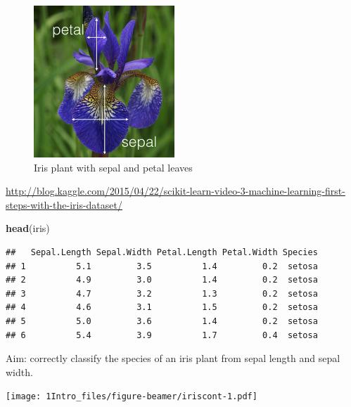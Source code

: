\documentclass[ignorenonframetext,]{beamer}
\newenvironment{Shaded}{\begin{snugshade}}{\end{snugshade}}
\newcommand{\KeywordTok}[1]{\textcolor[rgb]{0.13,0.29,0.53}{\textbf{#1}}}
\newcommand{\NormalTok}[1]{#1}
\begin{document}
\begin{frame}

\begin{figure}
\includegraphics[width=150pt]{iris} \caption{Iris plant with sepal and petal leaves}\label{fig:iris_pic}
\end{figure}

\url{http://blog.kaggle.com/2015/04/22/scikit-learn-video-3-machine-learning-first-steps-with-the-iris-dataset/}

\end{frame}

\begin{frame}[fragile]

\scriptsize

\begin{Shaded}
\begin{Highlighting}[]
\KeywordTok{head}\NormalTok{(iris)}
\end{Highlighting}
\end{Shaded}

\begin{verbatim}
##   Sepal.Length Sepal.Width Petal.Length Petal.Width Species
## 1          5.1         3.5          1.4         0.2  setosa
## 2          4.9         3.0          1.4         0.2  setosa
## 3          4.7         3.2          1.3         0.2  setosa
## 4          4.6         3.1          1.5         0.2  setosa
## 5          5.0         3.6          1.4         0.2  setosa
## 6          5.4         3.9          1.7         0.4  setosa
\end{verbatim}

\normalsize

\end{frame}

\begin{frame}

Aim: correctly classify the species of an iris plant from sepal length
and sepal width.

\texttt{[image: 1Intro\_files/figure-beamer/iriscont-1.pdf]}

\end{frame}
\end{document}
